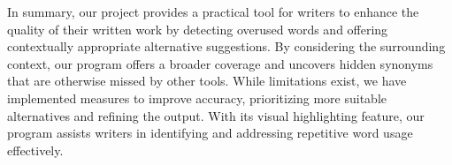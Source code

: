 \documentclass[12pt,oneside,openright,a4paper]{cpe-english-project}
\begin{document}
In summary, our project provides a practical tool for writers to enhance the quality of their written work by detecting overused words and offering contextually appropriate alternative suggestions. By considering the surrounding context, our program offers a broader coverage and uncovers hidden synonyms that are otherwise missed by other tools. While limitations exist, we have implemented measures to improve accuracy, prioritizing more suitable alternatives and refining the output. With its visual highlighting feature, our program assists writers in identifying and addressing repetitive word usage effectively.



%
%
%



\makeatletter
\g@addto@macro{\UrlBreaks}{\UrlOrds}
\makeatother




\end{document}
